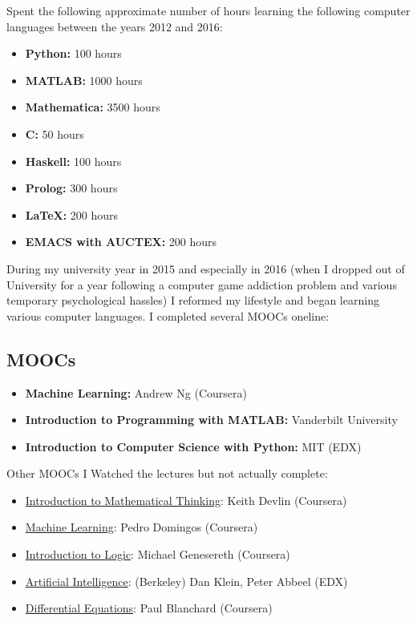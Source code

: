\documentclass[paper=a4, fontsize=11pt]{scrartcl} %
\numberwithin{equation}{section} %
\numberwithin{figure}{section} %
\numberwithin{table}{section} %
\begin{document}
Spent the following approximate number of hours learning the following computer languages between the years 2012 and 2016:
\begin{itemize}
\item \textbf{Python:}             100 hours
\item \textbf{MATLAB:}            1000 hours
\item \textbf{Mathematica:}       3500 hours
\item \textbf{C:}                   50 hours
\item \textbf{Haskell:}            100 hours
\item \textbf{Prolog:}             300 hours
\item \textbf{LaTeX:}              200 hours
                 
\item \textbf{EMACS with AUCTEX:}  200 hours  

\end{itemize}

During my university year in 2015 and especially in 2016 (when I dropped out of University for a year following a computer game addiction problem and various temporary psychological hassles) I reformed my lifestyle and began learning various computer languages. I completed several MOOCs oneline:
\subsection{MOOCs}

\begin{itemize}

\item \textbf{Machine Learning:} Andrew Ng (Coursera)
  \item  \textbf{Introduction to Programming with MATLAB:} Vanderbilt University
  \item   \textbf{Introduction to Computer Science with Python:} MIT (EDX)

    

    
\end{itemize}

Other MOOCs I Watched the lectures but not actually complete:


\begin{itemize}
\item \underline{Introduction to Mathematical Thinking}: Keith Devlin (Coursera)
\item \underline{Machine Learning}: Pedro Domingos (Coursera)
\item \underline{Introduction to Logic}: Michael Genesereth (Coursera)
\item \underline{Artificial Intelligence}: (Berkeley) Dan Klein, Peter Abbeel (EDX)
\item \underline{Differential Equations}: Paul Blanchard (Coursera)
\end{itemize}
\end{document}
